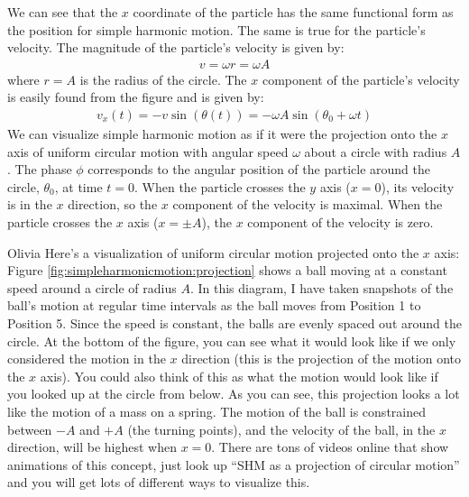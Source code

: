 We can see that the $x$ coordinate of the particle has the same functional form as the position for simple harmonic motion. The same is true for the particle's velocity. The magnitude of the particle's velocity is given by:
\begin{align*}
v = \omega r = \omega A
\end{align*}
where $r=A$ is the radius of the circle. The $x$ component of the particle's velocity is easily found from the figure and is given by:
\begin{align*}
v_x(t) = -v\sin(\theta(t)) = -\omega A\sin(\theta_0 + \omega t)
\end{align*}
We can visualize simple harmonic motion as if it were the projection onto the $x$ axis of uniform circular motion with angular speed $\omega$ about a circle with radius $A$. The phase $\phi$ corresponds to the angular position of the particle around the circle, $\theta_0$, at time $t=0$. When the particle crosses the $y$ axis ($x=0$), its velocity is in the $x$ direction, so the $x$ component of the velocity is maximal. When the particle crosses the $x$ axis ($x=\pm A$), the $x$ component of the velocity is zero.
\newpage
\begin{studentOpinion}{Olivia}
Here's a visualization of uniform circular motion projected onto the $x$ axis:
Figure \ref{fig:simpleharmonicmotion:projection} shows a ball moving at a constant speed around a circle of radius $A$. In this diagram, I have taken snapshots of the ball's motion at regular time intervals as the ball moves from Position 1 to Position 5. Since the speed is constant, the balls are evenly spaced out around the circle. At the bottom of the figure, you can see what it would look like if we only considered the motion in the $x$ direction (this is the projection of the motion onto the $x$ axis). You could also think of this as what the motion would look like if you looked up at the circle from below. As you can see, this projection looks a lot like the motion of a mass on a spring. The motion of the ball is constrained between $-A$ and $+A$ (the turning points), and the velocity of the ball, in the $x$ direction, will be highest when $x=0$. There are tons of videos online that show animations of this concept, just look up ``SHM as a projection of circular motion'' and you will get lots of different ways to visualize this.
\end{studentOpinion}




